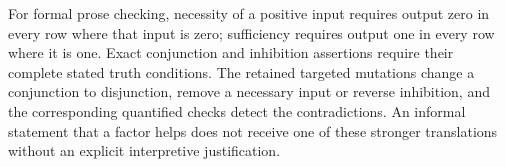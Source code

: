 \documentclass{svproc}
\begin{document}
For formal prose checking, necessity of a positive input requires output zero in every row where that input is zero; sufficiency requires output one in every row where it is one. Exact conjunction and inhibition assertions require their complete stated truth conditions. The retained targeted mutations change a conjunction to disjunction, remove a necessary input or reverse inhibition, and the corresponding quantified checks detect the contradictions. An informal statement that a factor helps does not receive one of these stronger translations without an explicit interpretive justification.
\label{sec:appendices-end}
\end{document}
